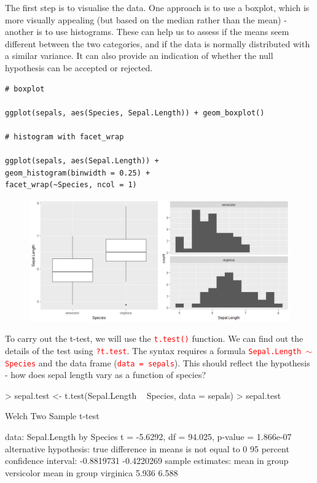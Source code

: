 \documentclass[a4paper,12pt]{article}
\newcommand\code[1]{\textcolor{red}{\texttt{#1}}}
\begin{document}
The first step is to visualise the data. One approach is to use a boxplot, which is more visually appealing (but based on the median rather than the mean) - another is to use histograms. These can help us to assess if the means seem different between the two categories, and if the data is normally distributed with a similar variance. It can also provide an indication of whether the null hypothesis can be accepted or rejected.

\begin{shaded}
\begin{verbatim}
# boxplot

ggplot(sepals, aes(Species, Sepal.Length)) + geom_boxplot()

# histogram with facet_wrap

ggplot(sepals, aes(Sepal.Length)) + 
geom_histogram(binwidth = 0.25) + 
facet_wrap(~Species, ncol = 1)
\end{verbatim}
\end{shaded}

\begin{figure}[h]
\centering 
\includegraphics[width=1\textwidth]{figs/boxplothist.png}
\label{fig:boxplothist}
\end{figure} 


To carry out the t-test, we will use the \code{t.test()} function. We can find out the details of the test using \code{?t.test}. The syntax requires a formula \code{Sepal.Length $\sim$ Species} and the data frame (\code{data = sepals}). This should reflect the hypothesis - how does sepal length vary as a function of species? \\


\begin{shaded}
\begin{Schunk}
\begin{Sinput}
> sepal.test <- t.test(Sepal.Length ~ Species, data = sepals)
> sepal.test
\end{Sinput}
\begin{Soutput}
	Welch Two Sample t-test

data:  Sepal.Length by Species
t = -5.6292, df = 94.025, p-value = 1.866e-07
alternative hypothesis: true difference in means is not equal to 0
95 percent confidence interval:
 -0.8819731 -0.4220269
sample estimates:
mean in group versicolor  mean in group virginica 
                   5.936                    6.588 
\end{Soutput}
\end{Schunk}
\end{shaded}
\end{document}
